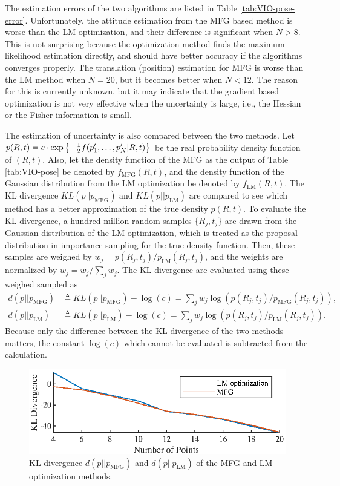 The estimation errors of the two algorithms are listed in Table \ref{tab:VIO-pose-error}.
Unfortunately, the attitude estimation from the MFG based method is worse than the LM optimization, and their difference is significant when $N>8$.
This is not surprising because the optimization method finds the maximum likelihood estimation directly, and should have better accuracy if the algorithms converges properly.
The translation (position) estimation for MFG is worse than the LM method when $N=20$, but it becomes better when $N<12$.
The reason for this is currently unknown, but it may indicate that the gradient based optimization is not very effective when the uncertainty is large, i.e., the Hessian or the Fisher information is small.

The estimation of uncertainty is also compared between the two methods.
Let $p(R,t) = c\cdot\exp\left\{ -\tfrac{1}{2} f(p'_1,\ldots,p'_N|R,t) \right\}$ be the real probability density function of $(R,t)$.
Also, let the density function of the MFG as the output of Table \ref{tab:VIO-pose} be denoted by $f_\text{MFG}(R,t)$, and the density function of the Gaussian distribution from the LM optimization be denoted by $f_\text{LM}(R,t)$.
The KL divergence $KL(p||p_\text{MFG})$ and $KL(p||p_\text{LM})$ are compared to see which method has a better approximation of the true density $p(R,t)$.
To evaluate the KL divergence, a hundred million random samples $\{R_j,t_j\}$ are drawn from the Gaussian distribution of the LM optimization, which is treated as the proposal distribution in importance sampling for the true density function.
Then, these samples are weighed by $w_j = p(R_j,t_j)/p_\text{LM}(R_j,t_j)$, and the weights are normalized by $w_j = w_j/\sum_{j} w_j$.
The KL divergence are evaluated using these weighed sampled as
\begin{align*}
	d(p||p_\text{MFG}) &\triangleq KL(p||p_\text{MFG}) - \log(c) = \sum_j w_j \log\left( p(R_j,t_j)/p_\text{MFG}(R_j,t_j) \right), \\
	d(p||p_\text{LM}) &\triangleq KL(p||p_\text{LM}) - \log(c) = \sum_j w_j \log\left( p(R_j,t_j)/p_\text{LM}(R_j,t_j) \right).
\end{align*}
Because only the difference between the KL divergence of the two methods matters, the constant $\log(c)$ which cannot be evaluated is subtracted from the calculation.

\begin{figure}
	\centering
	\includegraphics[scale=1.4]{figures/VIO-KL}
	\caption[KL divergence of the MFG and LM-optimization methods.]{KL divergence $d(p||p_\text{MFG})$ and $d(p||p_\text{LM})$ of the MFG and LM-optimization methods.}
	\label{fig:VIO-KL}
\end{figure}

